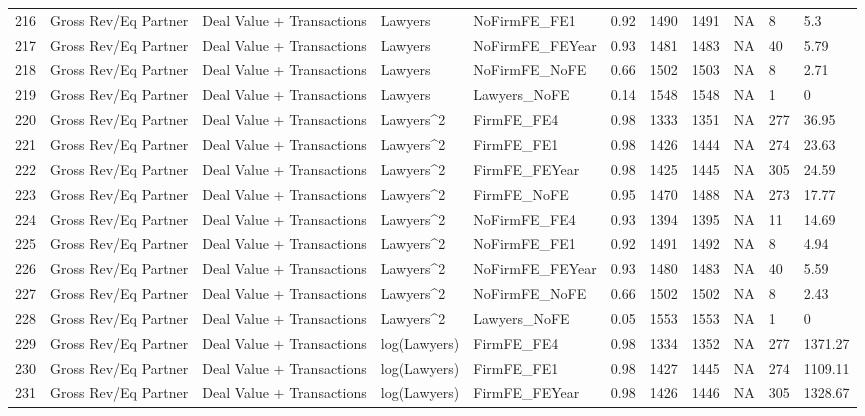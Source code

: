 \begin{table}[ht]
\begin{tabular}{rllllllllll}
  216 & Gross Rev/Eq Partner & Deal Value + Transactions & Lawyers & NoFirmFE\_FE1 & 0.92 & 1490 & 1491 & NA & 8 & 5.3 \\ 
  217 & Gross Rev/Eq Partner & Deal Value + Transactions & Lawyers & NoFirmFE\_FEYear & 0.93 & 1481 & 1483 & NA & 40 & 5.79 \\ 
  218 & Gross Rev/Eq Partner & Deal Value + Transactions & Lawyers & NoFirmFE\_NoFE & 0.66 & 1502 & 1503 & NA & 8 & 2.71 \\ 
  219 & Gross Rev/Eq Partner & Deal Value + Transactions & Lawyers & Lawyers\_NoFE & 0.14 & 1548 & 1548 & NA & 1 & 0 \\ 
  220 & Gross Rev/Eq Partner & Deal Value + Transactions & Lawyers^2 & FirmFE\_FE4 & 0.98 & 1333 & 1351 & NA & 277 & 36.95 \\ 
  221 & Gross Rev/Eq Partner & Deal Value + Transactions & Lawyers^2 & FirmFE\_FE1 & 0.98 & 1426 & 1444 & NA & 274 & 23.63 \\ 
  222 & Gross Rev/Eq Partner & Deal Value + Transactions & Lawyers^2 & FirmFE\_FEYear & 0.98 & 1425 & 1445 & NA & 305 & 24.59 \\ 
  223 & Gross Rev/Eq Partner & Deal Value + Transactions & Lawyers^2 & FirmFE\_NoFE & 0.95 & 1470 & 1488 & NA & 273 & 17.77 \\ 
  224 & Gross Rev/Eq Partner & Deal Value + Transactions & Lawyers^2 & NoFirmFE\_FE4 & 0.93 & 1394 & 1395 & NA & 11 & 14.69 \\ 
  225 & Gross Rev/Eq Partner & Deal Value + Transactions & Lawyers^2 & NoFirmFE\_FE1 & 0.92 & 1491 & 1492 & NA & 8 & 4.94 \\ 
  226 & Gross Rev/Eq Partner & Deal Value + Transactions & Lawyers^2 & NoFirmFE\_FEYear & 0.93 & 1480 & 1483 & NA & 40 & 5.59 \\ 
  227 & Gross Rev/Eq Partner & Deal Value + Transactions & Lawyers^2 & NoFirmFE\_NoFE & 0.66 & 1502 & 1502 & NA & 8 & 2.43 \\ 
  228 & Gross Rev/Eq Partner & Deal Value + Transactions & Lawyers^2 & Lawyers\_NoFE & 0.05 & 1553 & 1553 & NA & 1 & 0 \\ 
  229 & Gross Rev/Eq Partner & Deal Value + Transactions & log(Lawyers) & FirmFE\_FE4 & 0.98 & 1334 & 1352 & NA & 277 & 1371.27 \\ 
  230 & Gross Rev/Eq Partner & Deal Value + Transactions & log(Lawyers) & FirmFE\_FE1 & 0.98 & 1427 & 1445 & NA & 274 & 1109.11 \\ 
  231 & Gross Rev/Eq Partner & Deal Value + Transactions & log(Lawyers) & FirmFE\_FEYear & 0.98 & 1426 & 1446 & NA & 305 & 1328.67 \\ 

\end{tabular}
\end{table}
